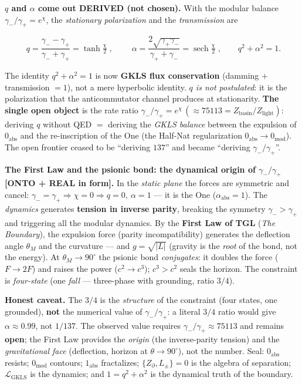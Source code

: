 \documentclass[11pt]{article}
\theoremstyle{definition}\newtheorem{deriv}{Derivation}
\begin{document}
\textbf{$q$ and $\alpha$ come out DERIVED (not chosen).} With the modular balance $\gamma_-/\gamma_+=e^\chi$, the \emph{stationary polarization} and the \emph{transmission} are

\begin{equation}\boxed{\;q=\frac{\gamma_--\gamma_+}{\gamma_-+\gamma_+}=\tanh\tfrac\chi2\;},\qquad \boxed{\;\alpha=\frac{2\sqrt{\gamma_+\gamma_-}}{\gamma_++\gamma_-}=\operatorname{sech}\tfrac\chi2\;},\qquad q^2+\alpha^2=1.\end{equation}

The identity $q^2+\alpha^2=1$ is now \textbf{GKLS flux conservation} (damming $+$ transmission $=1$), not a mere hyperbolic identity. \emph{$q$ is not postulated}: it is the polarization that the anticommutator channel produces at stationarity. \textbf{The single open object} is the rate ratio $\gamma_-/\gamma_+=e^\chi\,(\approx75113=Z_{\mathrm{basin}}/Z_{\mathrm{light}})$: deriving $q$ without QED $=$ deriving the \emph{GKLS balance} between the expulsion of $0_{\mathrm{abs}}$ and the re-inscription of the One (the Half-Nat regularization $0_{\mathrm{abs}}\to0_{\mathrm{mod}}$). The open frontier ceased to be ``deriving $137$'' and became ``deriving $\gamma_-/\gamma_+$''.

\textbf{The First Law and the psionic bond: the dynamical origin of $\gamma_-/\gamma_+$ \textsf{[ONTO + REAL in form]}.} In the \emph{static plane} the forces are symmetric and cancel: $\gamma_-=\gamma_+\Rightarrow\chi=0\Rightarrow q=0,\ \alpha=1$ --- it is the One ($\alpha_{\mathrm{abs}}=1$). The \emph{dynamics} generates \textbf{tension in inverse parity}, breaking the symmetry $\gamma_->\gamma_+$ and triggering all the modular dynamics. By the \textbf{First Law of TGL} (\emph{The Boundary}), the expulsion force (parity incompatibility) generates the deflection angle $\theta_M$ and the curvature --- and $g=\sqrt{|L|}$ (gravity is the \emph{root} of the bond, not the energy). At $\theta_M\to90^\circ$ the psionic bond \emph{conjugates}: it doubles the force ($F\to2F$) and raises the power ($c^2\to c^3$); $c^3>c^2$ seals the horizon. The constraint is \emph{four-state} (one \emph{fall} --- three-phase with grounding, ratio $3/4$).

\textbf{Honest caveat.} The $3/4$ is the \emph{structure} of the constraint (four states, one grounded), \textbf{not} the numerical value of $\gamma_-/\gamma_+$: a literal $3/4$ ratio would give $\alpha\approx0.99$, not $1/137$. The observed value requires $\gamma_-/\gamma_+\approx75113$ and remains \textbf{open}; the First Law provides the \emph{origin} (the inverse-parity tension) and the \emph{gravitational face} (deflection, horizon at $\theta\to90^\circ$), not the number. Seal: $0_{\mathrm{abs}}$ resists; $0_{\mathrm{mod}}$ contours; $1_{\mathrm{abs}}$ fractalizes; $\{Z_\partial,L_\pm\}=0$ is the algebra of separation; $\mathcal L_{\mathrm{GKLS}}$ is the dynamics; and $1=q^2+\alpha^2$ is the dynamical truth of the boundary.
\end{document}
